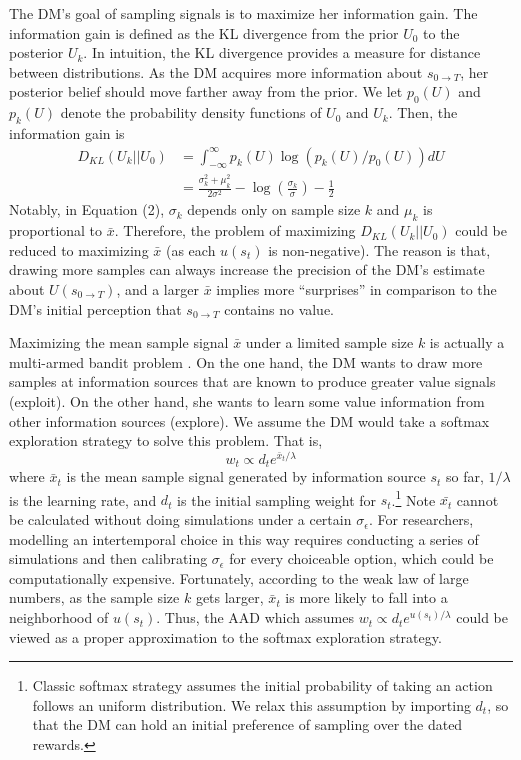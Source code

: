 \documentclass[
  12pt,
]{article}
\begin{document}
The DM's goal of sampling signals is to maximize her information gain.
The information gain is defined as the KL divergence from the prior
\(U_0\) to the posterior \(U_k\). In intuition, the KL divergence
provides a measure for distance between distributions. As the DM
acquires more information about \(s_{0\rightarrow T}\), her posterior
belief should move farther away from the prior. We let \(p_0(U)\) and
\(p_k(U)\) denote the probability density functions of \(U_0\) and
\(U_k\). Then, the information gain is\[\tag{2}
\begin{aligned}
D_{KL}(U_k||U_0)&=\int_{-\infty}^{\infty} p_k(U) \log\left(p_k(U)/p_0(U)\right)dU \\
&=\frac{\sigma_k^2+\mu_k^2}{2\sigma^2} - \log\left(\frac{\sigma_k}{\sigma}\right)-\frac{1}{2}
\end{aligned}
\]Notably, in Equation (2), \(\sigma_k\) depends only on sample size
\(k\) and \(\mu_k\) is proportional to \(\bar{x}\). Therefore, the
problem of maximizing \(D_{KL}(U_k||U_0)\) could be reduced to
maximizing \(\bar{x}\) (as each \(u(s_t)\) is non-negative). The reason
is that, drawing more samples can always increase the precision of the
DM's estimate about \(U(s_{0\rightarrow T})\), and a larger \(\bar{x}\)
implies more ``surprises'' in comparison to the DM's initial perception
that \(s_{0\rightarrow T}\) contains no value.

Maximizing the mean sample signal \(\bar{x}\) under a limited sample
size \(k\) is actually a multi-armed bandit problem
\citep[][Ch.2]{sutton2018reinforcement}. On the one hand, the DM wants
to draw more samples at information sources that are known to produce
greater value signals (exploit). On the other hand, she wants to learn
some value information from other information sources (explore). We
assume the DM would take a softmax exploration strategy to solve this
problem. That is,\[
w_t \propto d_t e^{\bar{x}_t/\lambda}
\]where \(\bar{x}_t\) is the mean sample signal generated by information
source \(s_t\) so far, \(1/\lambda\) is the learning rate, and \(d_t\)
is the initial sampling weight for \(s_t\).\footnote{Classic softmax
  strategy assumes the initial probability of taking an action follows
  an uniform distribution. We relax this assumption by importing
  \(d_t\), so that the DM can hold an initial preference of sampling
  over the dated rewards.} Note \(\bar{x_t}\) cannot be calculated
without doing simulations under a certain \(\sigma_\epsilon\). For
researchers, modelling an intertemporal choice in this way requires
conducting a series of simulations and then calibrating
\(\sigma_\epsilon\) for every choiceable option, which could be
computationally expensive. Fortunately, according to the weak law of
large numbers, as the sample size \(k\) gets larger, \(\bar{x}_t\) is
more likely to fall into a neighborhood of \(u(s_t)\). Thus, the AAD
which assumes \(w_t \propto d_t e^{u(s_t)/\lambda}\) could be viewed as
a proper approximation to the softmax exploration strategy.
\end{document}
